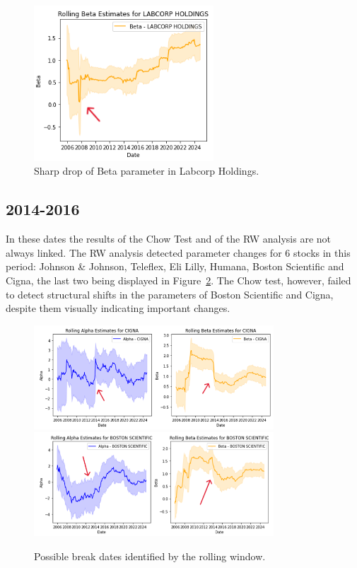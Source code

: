 \begin{figure}[h!]
    \centering
    \includegraphics[width=0.6\textwidth]{images/arrow1.png}
    \caption{Sharp drop of Beta parameter in Labcorp Holdings.}\label{fig:arrow1}
\end{figure}

\subsection{2014-2016}

In these dates the results of the Chow Test and of the RW analysis are not always linked. 
The RW analysis detected parameter changes for 6 stocks in this period: Johnson \& Johnson, Teleflex, Eli Lilly, Humana,
Boston Scientific and Cigna, the last two being displayed in Figure~\ref{fig:arrow2}.
The Chow test, however, failed to detect structural shifts in the parameters of Boston Scientific and Cigna, despite them 
visually indicating important changes.

\begin{figure}[h!]
    \centering
    \includegraphics[width=0.8\textwidth]{images/arrow2.png}
    \includegraphics[width=0.8\textwidth]{images/arrow3.png}
    \caption{Possible break dates identified by the rolling window.}\label{fig:arrow2}
\end{figure}

